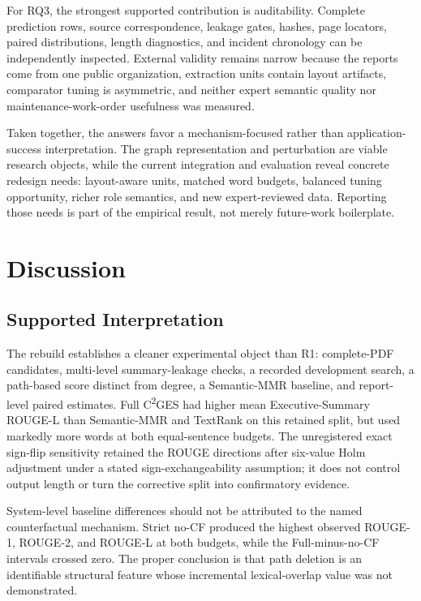 \documentclass[applsci,article,submit,moreauthors]{Definitions/mdpi}
\newcommand{\cges}{C\textsuperscript{2}GES}
\begin{document}
For RQ3, the strongest supported contribution is auditability. Complete prediction rows, source correspondence, leakage gates, hashes, page locators, paired distributions, length diagnostics, and incident chronology can be independently inspected. External validity remains narrow because the reports come from one public organization, extraction units contain layout artifacts, comparator tuning is asymmetric, and neither expert semantic quality nor maintenance-work-order usefulness was measured.

Taken together, the answers favor a mechanism-focused rather than application-success interpretation. The graph representation and perturbation are viable research objects, while the current integration and evaluation reveal concrete redesign needs: layout-aware units, matched word budgets, balanced tuning opportunity, richer role semantics, and new expert-reviewed data. Reporting those needs is part of the empirical result, not merely future-work boilerplate.

\section{Discussion}

\subsection{Supported Interpretation}

The rebuild establishes a cleaner experimental object than R1: complete-PDF candidates, multi-level summary-leakage checks, a recorded development search, a path-based score distinct from degree, a Semantic-MMR baseline, and report-level paired estimates. Full \cges{} had higher mean Executive-Summary ROUGE-L than Semantic-MMR and TextRank on this retained split, but used markedly more words at both equal-sentence budgets. The unregistered exact sign-flip sensitivity retained the ROUGE directions after six-value Holm adjustment under a stated sign-exchangeability assumption; it does not control output length or turn the corrective split into confirmatory evidence.

System-level baseline differences should not be attributed to the named counterfactual mechanism. Strict no-CF produced the highest observed ROUGE-1, ROUGE-2, and ROUGE-L at both budgets, while the Full-minus-no-CF intervals crossed zero. The proper conclusion is that path deletion is an identifiable structural feature whose incremental lexical-overlap value was not demonstrated.
\end{document}
